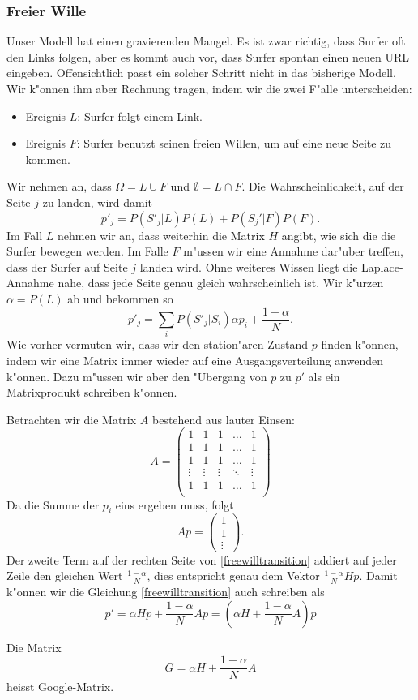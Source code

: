 \subsubsection{Freier Wille}
Unser Modell hat einen gravierenden Mangel.
Es ist zwar richtig, dass Surfer oft den
Links folgen, aber es kommt auch vor, dass
Surfer spontan einen neuen URL eingeben.
Offensichtlich passt ein solcher Schritt nicht in das bisherige Modell.
Wir k"onnen
ihm aber Rechnung tragen, indem wir die zwei F"alle unterscheiden:
\begin{itemize}
\item Ereignis $L$: Surfer folgt einem Link.
\item Ereignis $F$: Surfer benutzt seinen freien Willen,
um auf eine neue Seite zu kommen.
\end{itemize}
Wir nehmen an, dass $\Omega=L\cup F$ und $\emptyset=L\cap F$.
Die Wahrscheinlichkeit,
auf der Seite $j$ zu landen, wird damit
\[
p'_j=P(S'_j|L)P(L)+P(S_j'|F)P(F).
\]
Im Fall $L$ nehmen wir an, dass weiterhin die Matrix $H$ angibt, wie sich die
die Surfer bewegen werden.
Im Falle $F$ m"ussen wir eine Annahme dar"uber treffen,
dass der Surfer auf Seite $j$ landen wird.
Ohne weiteres Wissen liegt die Laplace-Annahme
nahe, dass jede Seite genau gleich wahrscheinlich ist.
Wir k"urzen $\alpha=P(L)$ ab und bekommen so
\begin{equation}
p'_j=\sum_{i}P(S'_j|S_i)\alpha p_i+\frac{1-\alpha}N.
\label{freewilltransition}
\end{equation}
Wie vorher vermuten wir, dass wir den station"aren Zustand $p$ finden k"onnen,
indem wir eine Matrix immer wieder auf eine Ausgangsverteilung anwenden k"onnen.
Dazu m"ussen wir aber den "Ubergang von $p$ zu $p'$ als ein Matrixprodukt
schreiben k"onnen.

Betrachten wir die Matrix $A$ bestehend aus lauter Einsen:
\[
A=\left(\begin{matrix}
1&1&1&\dots&1\\
1&1&1&\dots&1\\
1&1&1&\dots&1\\
\vdots&\vdots&\vdots&\ddots&\vdots\\
1&1&1&\dots&1\\
\end{matrix}\right)
\]
Da die Summe der $p_i$ eins ergeben muss, folgt
\[
Ap=\left(\begin{matrix}1\\1\\\vdots\end{matrix}\right).
\]
Der zweite Term auf der rechten Seite von \ref{freewilltransition}
addiert auf jeder
Zeile den gleichen Wert $\frac{1-\alpha}{N}$, dies entspricht genau dem Vektor
$\frac{1-\alpha}{N}Hp$.
Damit k"onnen wir die Gleichung \ref{freewilltransition} auch schreiben als
\begin{equation}
p'=\alpha Hp + \frac{1-\alpha}{N}Ap = \left(\alpha H+\frac{1-\alpha}{N}A\right)p
\end{equation}
\begin{definition} Die Matrix
\[
G=
\alpha H+\frac{1-\alpha}{N}A
\]
heisst Google-Matrix.
\end{definition}

